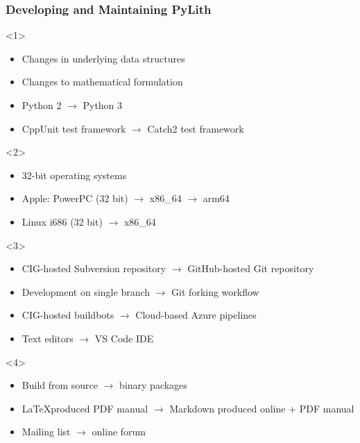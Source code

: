 \documentclass[aspectratio=169]{beamer}
\begin{document}
\begin{frame}
  \frametitle{Developing and Maintaining PyLith}
  
  \begin{itemize}
    \begin{onlyenv}<1>
      \begin{itemize}
      \item Changes in underlying data structures
      \item Changes to mathematical formulation
      \item Python 2 $\rightarrow$ Python 3
      \item CppUnit test framework $\rightarrow$ Catch2 test framework
      \end{itemize}
    \end{onlyenv}
    \begin{onlyenv}<2>    
      \begin{itemize}
      \item 32-bit operating systems
      \item Apple: PowerPC (32 bit) $\rightarrow$ x86\_64 $\rightarrow$ arm64
      \item Linux i686 (32 bit) $\rightarrow$ x86\_64
      \end{itemize}
    \end{onlyenv}    
    \begin{onlyenv}<3>
      \begin{itemize}
      \item CIG-hosted Subversion repository $\rightarrow$ GitHub-hosted Git repository
      \item Development on single branch $\rightarrow$ Git forking workflow
      \item CIG-hosted buildbots $\rightarrow$ Cloud-based Azure pipelines
      \item Text editors $\rightarrow$ VS Code IDE
      \end{itemize}
    \end{onlyenv}
    \begin{onlyenv}<4>
      \begin{itemize}
      \item Build from source $\rightarrow$ binary packages
      \item \LaTeX produced PDF manual $\rightarrow$ Markdown produced online + PDF manual
      \item Mailing list $\rightarrow$ online forum
      \end{itemize}
    \end{onlyenv}
  \end{itemize}

\end{frame}
\end{document}
